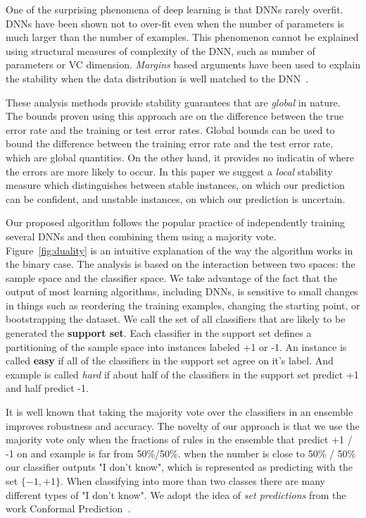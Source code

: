 \documentclass{article}
\begin{document}
One of the surprising phenomena of deep learning is that DNNs rarely
overfit. DNNs have been shown not to over-fit even when the number of
parameters is much larger than the number of examples.  This
phenomenon cannot be explained using structural measures of complexity
of the DNN, such as number of parameters or VC dimension. {\em
  Margins} based arguments have been used to explain the stability
when the data distribution is well matched to the
DNN~\cite{bartlett2017spectrally}.

 These analysis methods provide stability guarantees that are {\em
   global} in nature. The bounds proven using this approach are on the
 difference between the true error rate and the training or test error
 rates.  Global bounds can be used to bound the difference between the
 training error rate and the test error rate, which are global
 quantities. On the other hand, it provides no indicatin of where the
 errors are more likely to occur. In this paper we suggest a {\em local}
 stability measure which distinguishes between stable instances, on which our
 prediction can be confident, and unstable instances, on which our
 prediction is uncertain.

Our proposed algorithm follows the popular practice of independently training several DNNs and then combining them using a majority vote. Figure~\ref{fig:duality} is an intuitive explanation of the way the algorithm works in the binary case. The analysis is based on the interaction between two spaces: the sample space and the classifier space. We take advantage of the fact that the output of most learning algorithms, including DNNs, is sensitive to small changes in things such as reordering the training examples, changing the starting point, or bootstrapping the dataset.  We call the set of all classifiers that are likely to be generated the {\bf support set}. Each classifier in the support set defines a partitioning of the sample space into instances labeled +1 or -1. An instance is called {\bf easy} if all of the classifiers in the support set agree on it's label.  And example is called {\em hard} if about half of the classifiers in the support set predict +1 and half predict -1. 

It is well known that taking the majority vote over the classifiers in an ensemble improves robustness and accuracy. The novelty of our approach is that we use the majority vote only when the fractions of rules in the ensemble that predict +1 / -1 on and example is far from 50\%/50\%. when the number is close to 50\% / 50\% our classifier outputs "I don't know", which is represented as predicting with the set $\{-1,+1\}$. When classifying into more than two classes there are many different types of "I don't know". We adopt the idea of {\em set predictions} from the work Conformal Prediction~\cite{VovkConformalPrediction}.
\end{document}
